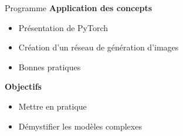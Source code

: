 \documentclass{formation}
\begin{document}
\begin{frame}{Programme}
  \textbf{Application des concepts}
  \begin{itemize}
  \item Présentation de PyTorch
  \item Création d'un réseau de génération d'images
  \item Bonnes pratiques
  \end{itemize}
  \textbf{Objectifs}
  \begin{itemize}
  \item Mettre en pratique
  \item Démystifier les modèles complexes
  \end{itemize}
\end{frame}
\end{document}
